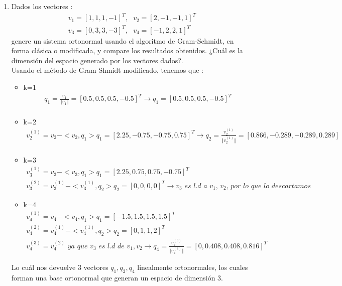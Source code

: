 \documentclass{article}
\begin{document}
\begin{enumerate}
\item Dados los vectores :
\begin{gather*}
v_{1} = [ 1, 1, 1, -1]^{T},\textit{   } v_{2} = [2,-1,-1,1]^{T} \\
v_{3} = [ 0, 3, 3, -3]^{T},\textit{   } v_{4} = [-1,2,2,1]^{T}
\end{gather*}
genere un sistema ortonormal usando el algoritmo de Gram-Schmidt, en forma cl\'asica o modificada, y compare los resultados obtenidos. ¿Cu\'al es la dimensi\'on del espacio generado por los vectores dados?.
\\
Usando el m\'etodo de Gram-Shmidt modificado, tenemos que :
\begin{itemize}
\item k=1
	\begin{gather*}
	q_{1} = \frac{v_{1}}{\Vert v_{1} \Vert} = [0.5, 0.5, 0.5, -0.5]^{T}
	\rightarrow q_{1} = [0.5, 0.5, 0.5, -0.5]^{T}\\
	\end{gather*}
\item k=2
	\begin{gather*}
	v_{2}^{(1)} = v_{2} - <v_{2},q_{1}>q_{1} = [2.25, -0.75, -0.75, 0.75]^{T} \rightarrow q_{2} = 		\frac{ v_{2}^{(1)} }{\Vert v_{2}^{(1)} \Vert} = [0.866, -0.289, -0.289, 0.289]\\
	\end{gather*}
\item k=3
	\begin{gather*}
	v_{3}^{(1)} = v_{3} - <v_{3},q_{1}>q_{1} = [2.25, 0.75, 0.75, -0.75]^{T}\\
	v_{3}^{(2)} = v_{3}^{(1)} - <v_{3}^{(1)},q_{2}>q_{2} = [0, 0, 0, 0]^{T} \rightarrow v_{3} 	\textit{ es l.d a $v_{1}$, $v_{2}$, por lo que lo descartamos }
	\end{gather*}
\item k=4
	\begin{gather*}
	v_{4}^{(1)} = v_{4} - <v_{4},q_{1}>q_{1} = [-1.5, 1.5, 1.5, 1.5]^{T}\\
	v_{4}^{(2)} = v_{4}^{(1)} - <v_{4}^{(1)},q_{2}>q_{2} = [0, 1, 1, 2]^{T} \\
	v_{4}^{(3)} = v_{4}^{(2)} \textit{ ya que $v_{3}$ es l.d de $v_{1},v_{2}$}
	\rightarrow q_{4} = \frac{v_{4}^{(3)}}{\Vert v_{4}^{(3)} \Vert}= [0, 0.408, 0.408, 0.816]^{T}
	\end{gather*}
\end{itemize}
Lo cu\'al nos devuelve 3 vectores $q_{1},q_{2},q_{4}$ linealmente ortonormales, los cuales forman una base ortonormal que generan un espacio de dimensi\'on 3.

\end{enumerate}
\end{document}
